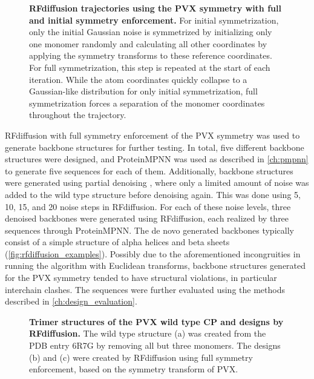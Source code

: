 \begin{figure}[!hbtp]
    \centering
    
    \caption{\textbf{RFdiffusion trajectories using the PVX symmetry with full and initial symmetry enforcement. } For initial symmetrization, only the initial Gaussian noise is symmetrized by initializing only one monomer randomly and calculating all other coordinates by applying the symmetry transforms to these reference coordinates. For full symmetrization, this step is repeated at the start of each iteration. While the atom coordinates quickly collapse to a Gaussian-like distribution for only initial symmetrization, full symmetrization forces a separation of the monomer coordinates throughout the trajectory. }
    \label{fig:rfdiff_sym_trajectories}
\end{figure}

\FloatBarrier

RFdiffusion with full symmetry enforcement of the PVX symmetry was used to generate backbone structures for further testing. In total, five different backbone structures were designed, and ProteinMPNN was used as described in \autoref{ch:pmpnn} to generate five sequences for each of them. Additionally, backbone structures were generated using partial denoising \cite{RFdiffusion}, where only a limited amount of noise was added to the wild type structure before denoising again. This was done using 5, 10, 15, and 20 noise steps in RFdiffusion. For each of these noise levels, three denoised backbones were generated using RFdiffusion, each realized by three sequences through ProteinMPNN. The de novo generated backbones typically consist of a simple structure of alpha helices and beta sheets (\autoref{fig:rfdiffusion_examples}). Possibly due to the aforementioned incongruities in running the algorithm with Euclidean transforms, backbone structures generated for the PVX symmetry tended to have structural violations, in particular interchain clashes. The sequences were further evaluated using the methods described in \autoref{ch:design_evaluation}.


\begin{figure}
\centering

\caption{\textbf{Trimer structures of the PVX wild type CP and designs by RFdiffusion. } The wild type structure (a) was created from the PDB entry 6R7G by removing all but three monomers. The designs (b) and (c) were created by RFdiffusion using full symmetry enforcement, based on the symmetry transform of PVX. }
\label{fig:rfdiffusion_examples}
\end{figure}

